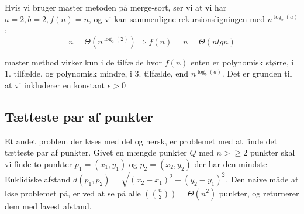 Hvis vi bruger master metoden på merge-sort, ser vi at vi har $a = 2, b=2, f(n)=n$, og vi kan sammenligne rekursionsligningen med $n^{\log_b(a)}$:
$$n = \Theta(n^{\log_2(2)}) \Rightarrow f(n) = n = \Theta(nlgn)$$

master method virker kun i de tilfælde hvor $f(n)$ enten er polynomisk større, i 1. tilfælde, og polynomisk mindre, i 3. tilfælde, end $n^{\log_b(a)}$. Det er grunden til at vi inkluderer en konstant $\epsilon > 0$
\subsection{Tætteste par af punkter}
Et andet problem der løses med del og hersk, er problemet med at finde det tætteste par af punkter. Givet en mængde punkter $Q$ med $n > \geq 2$ punkter skal vi finde to punkter $p_1 = (x_1, y_1)$ og $p_2 = (x_2, y_2)$ der har den mindste Euklidiske afstand $d(p_1, p_2) = \sqrt{(x_2 - x_1)^2 + (y_2 - y_1)^2}$. Den naive måde at løse problemet på, er ved at se på alle $(n \choose 2) = \Theta(n^2)$ punkter, og returnerer dem med lavest afstand.\\

